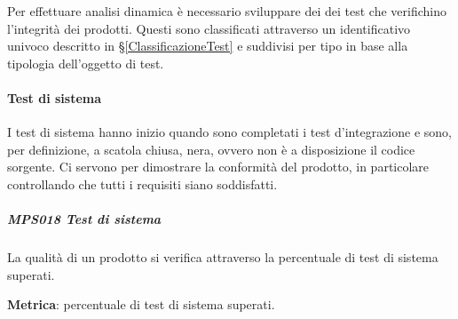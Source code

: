         Per effettuare analisi dinamica è necessario sviluppare dei dei test che verifichino l'integrità dei prodotti. Questi sono classificati attraverso un identificativo univoco descritto in \S\ref{ClassificazioneTest} e suddivisi per tipo in base alla tipologia dell'oggetto di test.



			\paragraph{Test di sistema} \label{testsistema}
			I test di sistema hanno inizio quando sono completati i test d'integrazione e sono, per definizione, a scatola chiusa, nera, ovvero non è a disposizione il codice sorgente.
			Ci servono per dimostrare la conformità del prodotto, in particolare controllando che tutti i requisiti siano soddisfatti.

            \subparagraph{MPS018 Test di sistema}\label{testsistema:met}
            La qualità di un prodotto si verifica attraverso la percentuale di test di sistema superati.

            \textbf{Metrica}: percentuale di test di sistema superati.

